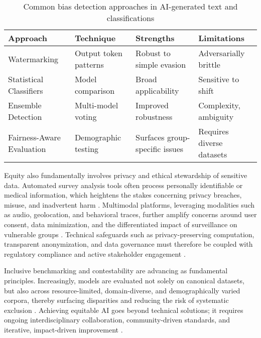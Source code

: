\begin{table*}[htbp]
\centering
\caption{Common bias detection approaches in AI-generated text and classifications}
\label{tab:bias_detection_methods}
\begin{adjustbox}{max width=\textwidth}
\begin{tabular}{@{}llll@{}}
\toprule
\textbf{Approach}        & \textbf{Technique}       & \textbf{Strengths}              & \textbf{Limitations}        \\
\midrule
Watermarking             & Output token patterns    & Robust to simple evasion        & Adversarially brittle       \\
Statistical Classifiers  & Model comparison        & Broad applicability             & Sensitive to shift          \\
Ensemble Detection       & Multi-model voting      & Improved robustness             & Complexity, ambiguity       \\
Fairness-Aware Evaluation& Demographic testing     & Surfaces group-specific issues  & Requires diverse datasets   \\
\bottomrule
\end{tabular}
\end{adjustbox}
\end{table*}

Equity also fundamentally involves privacy and ethical stewardship of sensitive data. Automated survey analysis tools often process personally identifiable or medical information, which heightens the stakes concerning privacy breaches, misuse, and inadvertent harm \cite{ref7}\cite{ref10}\cite{ref14}\cite{ref45}\cite{ref53}\cite{ref80}\cite{ref82}\cite{ref89}\cite{ref100}. Multimodal platforms, leveraging modalities such as audio, geolocation, and behavioral traces, further amplify concerns around user consent, data minimization, and the differentiated impact of surveillance on vulnerable groups \cite{ref7}\cite{ref9}\cite{ref14}\cite{ref23}\cite{ref24}\cite{ref53}\cite{ref84}\cite{ref85}\cite{ref89}\cite{ref90}\cite{ref91}\cite{ref100}. Technical safeguards such as privacy-preserving computation, transparent anonymization, and data governance must therefore be coupled with regulatory compliance and active stakeholder engagement \cite{ref14}\cite{ref39}\cite{ref41}\cite{ref90}\cite{ref91}\cite{ref100}\cite{ref105}\cite{ref106}.

Inclusive benchmarking and contestability are advancing as fundamental principles. Increasingly, models are evaluated not solely on canonical datasets, but also across resource-limited, domain-diverse, and demographically varied corpora, thereby surfacing disparities and reducing the risk of systematic exclusion \cite{ref4}\cite{ref10}\cite{ref13}\cite{ref51}\cite{ref53}\cite{ref66}\cite{ref70}\cite{ref84}\cite{ref85}\cite{ref91}\cite{ref92}\cite{ref94}\cite{ref96}\cite{ref105}\cite{ref106}. Achieving equitable AI goes beyond technical solutions; it requires ongoing interdisciplinary collaboration, community-driven standards, and iterative, impact-driven improvement \cite{ref39}\cite{ref64}\cite{ref70}\cite{ref76}\cite{ref80}\cite{ref83}\cite{ref91}\cite{ref93}\cite{ref99}\cite{ref106}.

